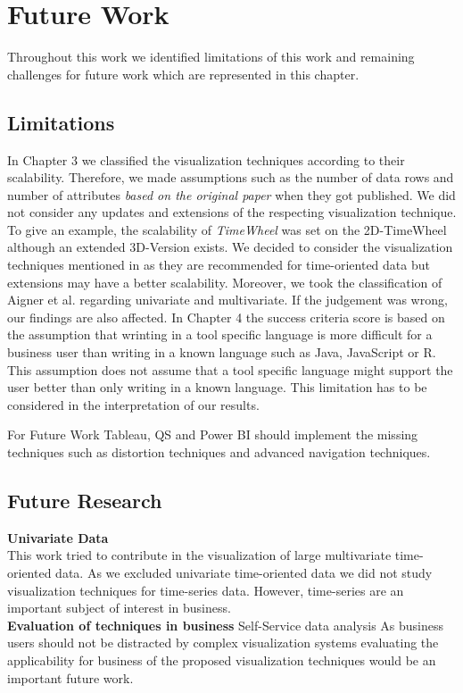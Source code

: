 \chapter{Future Work}
\label{Future Work}
Throughout this work we identified limitations of this work and remaining challenges for future work which are represented in this chapter. 

\section{Limitations} \label{limitations}
In Chapter 3 we classified the visualization techniques according to their scalability. Therefore, we made assumptions such as the number of data rows and number of attributes \textit{based on the original paper} when they got published. We did not consider any updates and extensions of the respecting visualization technique. To give an example, the scalability of \textit{TimeWheel} was set on the 2D-TimeWheel although an extended 3D-Version exists. We decided to consider the visualization techniques mentioned in\cite{Aigner2011} as they are recommended for time-oriented data but extensions may have a better scalability.  
Moreover, we took the classification of Aigner et al.\cite{Aigner2011} regarding univariate and multivariate. If the judgement was wrong, our findings are also affected.
In Chapter 4 the success criteria score is based on the assumption that wrinting in a tool specific language is more difficult for a business user than writing in a known language such as Java, JavaScript or R. This assumption does not assume that a tool specific language might support the user better than only writing in a known language. This limitation has to be considered in the interpretation of our results.



For Future Work Tableau, QS and Power BI should implement the missing techniques such as distortion techniques and advanced navigation techniques. 
\section{Future Research}
\textbf{Univariate Data}\\
This work tried to contribute in the visualization of large multivariate time-oriented data. As we excluded univariate time-oriented data we did not study visualization techniques for time-series data. However, time-series are an important subject of interest in business.\\
\textbf{Evaluation of techniques in business}
Self-Service data analysis 
As business users should not be distracted by complex visualization systems \cite{Tegarden1999} evaluating the applicability for business of the proposed visualization techniques would be an important future work.





